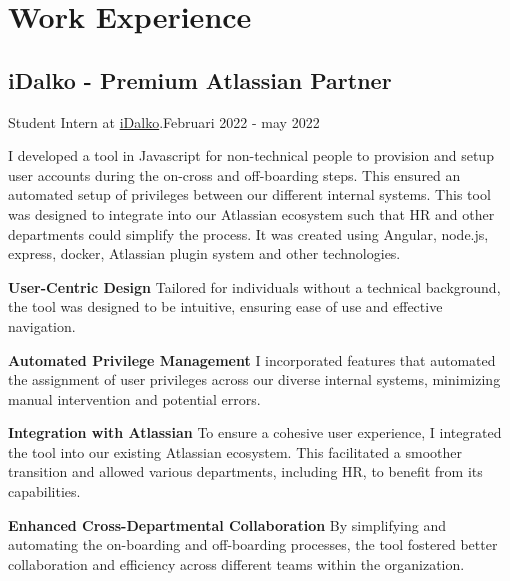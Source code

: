 \section{Work Experie\textcolor{mycolor}{nce}}
\subsection{iDalko - Premium Atlassian Partner}
\vspace{.55em}

Student Intern at {\href{https://www.idalko.com}{iDalko}}.{\textcolor{mygrey}{\hspace*{\fill}Februari 2022 - may 2022}}
\vspace{.55em}
\begin{flushleft}
\par
I developed a tool in \textcolor{mycolor}{Javascript} for non-technical people to provision and setup user accounts during the on-cross and off-boarding steps. This ensured an automated setup of privileges between our different internal systems.
This tool was designed to integrate into our Atlassian ecosystem such that HR and other departments could simplify the process.
It was created using \textcolor{mycolor}{Angular, node.js, express, docker, Atlassian plugin system} and other technologies.
\vspace{.55em}
\par
\textbf{User-Centric Design}
Tailored for individuals without a technical background, the tool was designed to be intuitive, ensuring ease of use and effective navigation.
\vspace{.55em}
\par
\textbf{Automated Privilege Management}
I incorporated features that automated the assignment of user privileges across our diverse internal systems, minimizing manual intervention and potential errors.
\vspace{.55em}
\par
\textbf{Integration with Atlassian}
To ensure a cohesive user experience, I integrated the tool into our existing Atlassian ecosystem. This facilitated a smoother transition and allowed various departments, including HR, to benefit from its capabilities.
\vspace{.55em}
\par
\textbf{Enhanced Cross-Departmental Collaboration}
By simplifying and automating the on-boarding and off-boarding processes, the tool fostered better collaboration and efficiency across different teams within the organization.
\end{flushleft}
